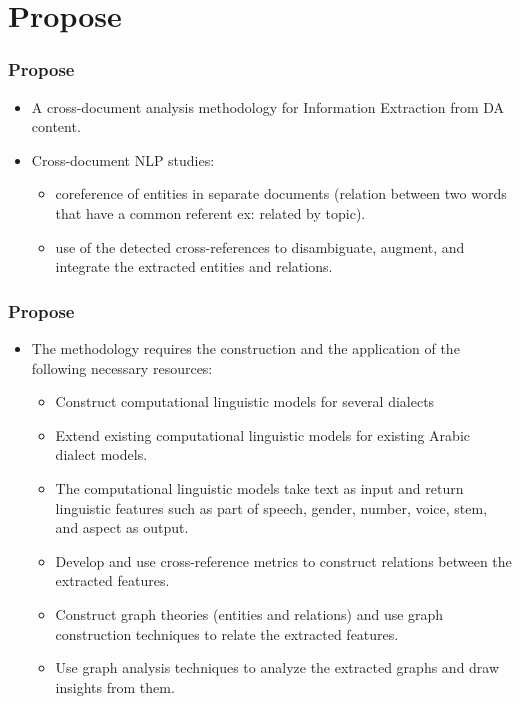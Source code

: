 \documentclass[xcolor=table]{beamer}
\begin{document}
\section{Propose}
\begin{frame}
\frametitle{Propose}
\begin{itemize}
\item A cross-document analysis methodology for Information Extraction from DA content.
\item Cross-document NLP studies:
\begin{itemize}
\item coreference of entities in separate documents (relation between two words that have a common referent ex: related by topic).

\item use of the detected cross-references to disambiguate, augment, and integrate the extracted entities and relations.
\end{itemize}
\end{itemize}

\end{frame}

\begin{frame}[allowframebreaks]
\frametitle{Propose}
\begin{itemize}
\item The methodology requires the construction and the application of the following necessary resources:
\begin{itemize}
    \item Construct computational linguistic models for several dialects 
    \item Extend existing computational linguistic models for existing Arabic dialect models.
    \item The computational linguistic models take text as input and return linguistic features such as part of speech, gender, number, voice, stem, and aspect as output.
    \framebreak
     \item Develop and use cross-reference metrics to construct relations between the extracted features.
     \item Construct graph theories (entities and relations) and use graph construction techniques to relate the extracted features.
    \item Use graph analysis techniques to analyze the extracted graphs and draw insights from them.
\end{itemize}

\end{itemize}

\end{frame}
\end{document}
